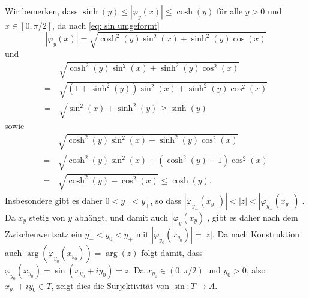 \documentclass[a4paper,10pt]{article}
\begin{document}
Wir bemerken, dass $\sinh(y) \leq |\varphi_y(x)| \leq \cosh(y)$ für alle $y > 0$ und $x \in [0,\pi/2]$, da nach \eqref{eq: sin umgeformt}
\[
 |\varphi_y(x)| = \sqrt{\cosh^2(y)\sin^2(x)+\sinh^2(y)\cos(x)}
\]
und
\begin{align*}
  &\,\sqrt{\cosh^2(y)\sin^2(x)+\sinh^2(y)\cos^2(x)} \\
 =&\, \sqrt{(1+\sinh^2(y))\sin^2(x)+\sinh^2(y)\cos^2(x)} \\
 =&\, \sqrt{\sin^2(x)+\sinh^2(y)}
 \geq \sinh(y)
\end{align*}
sowie
\begin{align*}
  &\,\sqrt{\cosh^2(y)\sin^2(x)+\sinh^2(y)\cos^2(x)} \\
 =&\, \sqrt{\cosh^2(y)\sin^2(x)+(\cosh^2(y)-1)\cos^2(x)} \\
 =&\, \sqrt{\cosh^2(y)-\cos^2(x)}
 \leq \cosh(y).
\end{align*}
Insbesondere gibt es daher $0 < y_- < y_+$, so dass
$
 |\varphi_{y_-}\left(x_{y_-}\right)| < |z| <  |\varphi_{y_+}\left(x_{y_+}\right)|.
$
Da $x_y$ stetig von $y$ abhängt, und damit auch $|\varphi_y(x_y)|$, gibt es daher nach dem Zwischenwertsatz ein $y_- < y_0 < y_+$ mit $|\varphi_{y_0}\left(x_{y_0}\right)| = |z|$. Da nach Konstruktion auch $\arg\left(\varphi_{y_0}\left(x_{y_0}\right)\right) = \arg(z)$ folgt damit, dass
$
 \varphi_{y_0}\left(x_{y_0}\right) = \sin(x_{y_0}+iy_0) = z.
$
Da $x_{y_0} \in (0,\pi/2)$ und $y_0 > 0$, also $x_{y_0}+iy_0 \in T$, zeigt dies die Surjektivität von $\sin : T \to A$.
\end{document}
